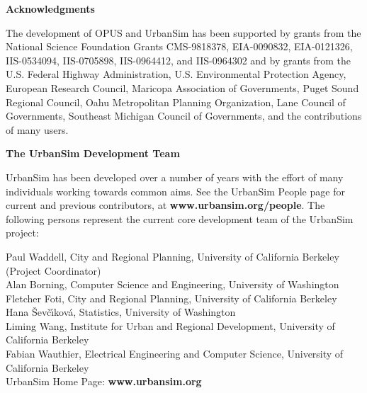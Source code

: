 
{\bf \large Acknowledgments}

The development of OPUS and UrbanSim has been supported by
grants from the National Science Foundation Grants CMS-9818378,
EIA-0090832, EIA-0121326, IIS-0534094, IIS-0705898, IIS-0964412, and IIS-0964302 
and by grants from the U.S. Federal Highway Administration, U.S. Environmental Protection Agency, European Research Council, Maricopa Association of Governments, Puget Sound Regional Council, Oahu Metropolitan Planning Organization, Lane Council of Governments, Southeast Michigan Council of Governments, and
the contributions of many users. 

{\bf \large The UrbanSim Development Team}

UrbanSim has been developed over a number of years with the effort of many individuals working towards common aims. See the UrbanSim People page for current and previous contributors, at {\bf www.urbansim.org/people}. The following persons represent the current core development team of the UrbanSim project:

Paul Waddell, City and Regional Planning, University of California Berkeley (Project Coordinator)\\
Alan Borning, Computer Science and Engineering, University of Washington\\
Fletcher Foti, City and Regional Planning, University of California Berkeley\\
Hana \v{S}ev\v{c}\'{\i}kov\'{a}, Statistics, University of Washington\\
Liming Wang, Institute for Urban and Regional Development, University of California Berkeley\\
Fabian Wauthier, Electrical Engineering and Computer Science, University of California Berkeley\\

UrbanSim Home Page: {\bf www.urbansim.org} 



